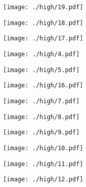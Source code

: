 \documentclass[runningheads]{llncs}
\begin{document}
\begin{figure*}
    \centering
    \begin{minipage}{.5\textwidth}
        \centering
        \texttt{[image: ./high/19.pdf]}
\end{minipage}\begin{minipage}{0.5\textwidth}
        \centering
        \texttt{[image: ./high/18.pdf]}
\end{minipage}

    \begin{minipage}{0.5\textwidth}
        \centering
        \texttt{[image: ./high/17.pdf]}
\end{minipage}\begin{minipage}{0.5\textwidth}
        \centering
        \texttt{[image: ./high/4.pdf]}
\end{minipage}

    \begin{minipage}{0.5\textwidth}
        \centering
        \texttt{[image: ./high/5.pdf]}
\end{minipage}\begin{minipage}{0.5\textwidth}
        \centering
        \texttt{[image: ./high/16.pdf]}
\end{minipage}

    \begin{minipage}{0.5\textwidth}
        \centering
        \texttt{[image: ./high/7.pdf]}
\end{minipage}\begin{minipage}{0.5\textwidth}
        \centering
        \texttt{[image: ./high/8.pdf]}
\end{minipage}

    \begin{minipage}{0.5\textwidth}
        \centering
        \texttt{[image: ./high/9.pdf]}
\end{minipage}\begin{minipage}{0.5\textwidth}
        \centering
        \texttt{[image: ./high/10.pdf]}
\end{minipage}

    \begin{minipage}{0.5\textwidth}
        \centering
        \texttt{[image: ./high/11.pdf]}
\end{minipage}\begin{minipage}{0.5\textwidth}
        \centering
        \texttt{[image: ./high/12.pdf]}
\end{minipage}


\end{figure*}
\end{document}
